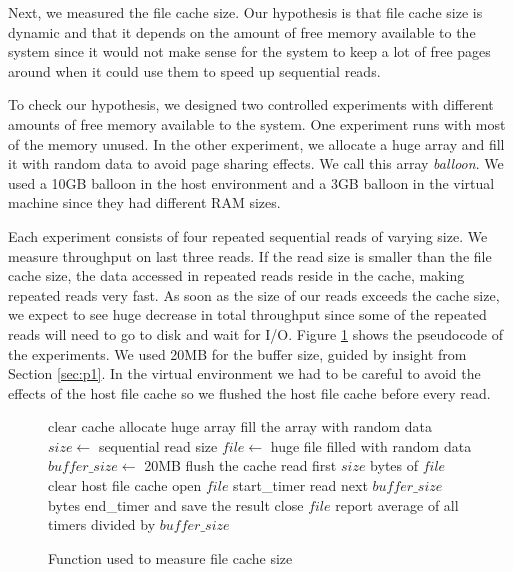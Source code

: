 Next, we measured the file cache size. Our hypothesis is that file cache size is dynamic and that it depends on the amount of free memory available to the system since it would not make sense for the system to keep a lot of free pages around when it could use them to speed up sequential reads.

To check our hypothesis, we designed two controlled experiments with different amounts of free memory available to the system. One experiment runs with most of the memory unused. In the other experiment, we allocate a huge array and fill it with random data to avoid page sharing effects. We call this array \emph{balloon}. We used a 10GB balloon in the host environment and a 3GB balloon in the virtual machine since they had different RAM sizes.

Each experiment consists of four repeated sequential reads of varying size. We measure throughput on last three reads. If the read size is smaller than the file cache size, the data accessed in repeated reads reside in the cache, making repeated reads very fast. As soon as the size of our reads exceeds the cache size, we expect to see huge decrease in total throughput since some of the repeated reads will need to go to disk and wait for I/O. Figure \ref{fig:p3pseudo} shows the pseudocode of the experiments. We used 20MB for the buffer size, guided by insight from Section \ref{sec:p1}. In the virtual environment we had to be careful to avoid the effects of the host file cache so we flushed the host file cache before every read.

\begin{figure}
\begin{algorithmic}
\STATE clear cache
\STATE allocate huge array
\STATE fill the array with random data
\ENDIF
\STATE $size \leftarrow$ {sequential read size}
\STATE $file \leftarrow$ {huge file filled with random data}
\STATE $buffer\_size \leftarrow$ 20MB
\STATE flush the cache
\STATE read first $size$ bytes of $file$
\STATE clear host file cache
\ENDIF
\STATE open $file$
\STATE start\_timer
\STATE read next $buffer\_size$ bytes
\STATE end\_timer and save the result
\ENDWHILE
\STATE close $file$
\ENDFOR
\STATE report average of all timers divided by $buffer\_size$
\end{algorithmic}
\caption{Function used to measure file cache size}
\label{fig:p3pseudo}
\end{figure}

